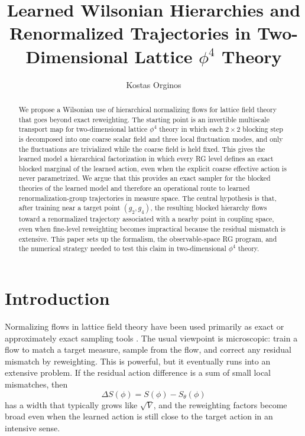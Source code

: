 \documentclass[aps,prd,reprint,nofootinbib,superscriptaddress,longbibliography]{revtex4-2}
\begin{document}
\title{Learned Wilsonian Hierarchies and Renormalized Trajectories in Two-Dimensional Lattice $\phi^4$ Theory}

\author{Kostas Orginos}

\begin{abstract}
We propose a Wilsonian use of hierarchical normalizing flows for lattice field
theory that goes beyond exact reweighting. The starting point is an invertible
multiscale transport map for two-dimensional lattice $\phi^4$ theory in which
each $2\times2$ blocking step is decomposed into one coarse scalar field and
three local fluctuation modes, and only the fluctuations are trivialized while
the coarse field is held fixed. This gives the learned model a hierarchical
factorization in which every RG level defines an exact blocked marginal of the
learned action, even when the explicit coarse effective action is never
parametrized. We argue that this provides an exact sampler for the blocked
theories of the learned model and therefore an operational route to learned
renormalization-group trajectories in measure space. The central hypothesis is
that, after training near a target point $(g_2,g_4)$, the resulting blocked
hierarchy flows toward a renormalized trajectory associated with a nearby point
in coupling space, even when fine-level reweighting becomes impractical because
the residual mismatch is extensive. This paper sets up the formalism, the
observable-space RG program, and the numerical strategy needed to test this
claim in two-dimensional $\phi^4$ theory.
\end{abstract}

\maketitle

\section{Introduction}

Normalizing flows in lattice field theory have been used primarily as exact or
approximately exact sampling tools \cite{Dinh2017RealNVP,Albergo2019FlowMCMC,Kanwar2020Equivariant,Albergo2021FlowScaling}.
The usual viewpoint is microscopic: train a flow to match a target measure,
sample from the flow, and correct any residual mismatch by reweighting. This is
powerful, but it eventually runs into an extensive problem. If the residual
action difference is a sum of small local mismatches, then
\begin{equation}
\Delta S(\phi)=S(\phi)-S_\theta(\phi)
\end{equation}
has a width that typically grows like $\sqrt{V}$, and the reweighting factors
become broad even when the learned action is still close to the target action in
an intensive sense.
\end{document}
